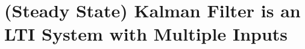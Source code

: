 \documentclass[10pt]{beamer}
\DeclareMathOperator{\1}{\textbf{1}}
\begin{document}


	  \section{(Steady State) Kalman Filter is an LTI System with Multiple Inputs}
\end{document}
